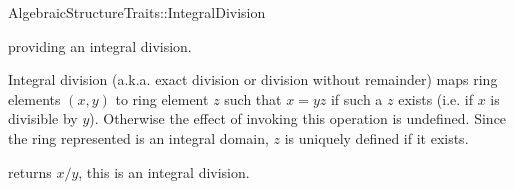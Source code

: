 \begin{ccRefConcept}{AlgebraicStructureTraits::IntegralDivision}

\ccDefinition

 providing an integral division. 

Integral division (a.k.a. exact division or division without remainder) maps 
ring elements $(x,y)$ to ring element $z$ such that $x = yz$ if such a $z$ 
exists (i.e. if $x$ is divisible by $y$). Otherwise the effect of invoking 
this operation is undefined. Since the ring represented is an integral domain, 
$z$ is uniquely defined if it exists. 

\ccRefines 


\ccTypes

\ccGlue
{}\ccGlue
{}

\ccOperations
{}
        { returns  $x/y$, this is an integral division. }


\ccSeeAlso


\end{ccRefConcept} 

